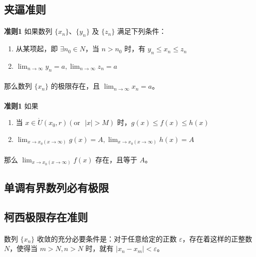 \subsection{夹逼准则}
\paragraph{}
\textbf{准则1} 如果数列 $\{x_n\}$、$\{y_n\}$ 及 $\{z_n\}$ 满足下列条件：

\begin{enumerate}
  \item 从某项起，即 $\exists n_0 \in N$，当 $n > n_0$ 时，有 $y_n \leq x_n \leq z_n$
  \item $\displaystyle{\lim_{n \to \infty} y_n = a, \lim_{n \to \infty} z_n = a}$
\end{enumerate}

\paragraph{}
那么数列 $\{x_n\}$ 的极限存在，且 $\displaystyle{\lim_{n \to \infty} x_n = a}$。

\paragraph{}
\textbf{准则1} 如果

\begin{enumerate}
  \item 当 $x \in \mathring{U}(x_0, r)(\text{or~~}|x| > M)$ 时，$g(x) \leq f(x) \leq h(x)$
  \item $\displaystyle{\lim_{x \to x_0 (x \to \infty)} g(x) = A, \lim_{x \to x_0 (x \to \infty)} h(x) = A}$
\end{enumerate}

\paragraph{}
那么 $\displaystyle{\lim_{x \to x_0 (x \to \infty)} f(x)}$ 存在，且等于 $A$。

\subsection{单调有界数列必有极限}

\subsection{柯西极限存在准则}
\paragraph{}
数列 $\{x_n\}$ 收敛的充分必要条件是：对于任意给定的正数 $\varepsilon$，存在着这样的正整数 $N$，使得当 $m > N, n > N$ 时，就有 $|x_n - x_m| < \varepsilon$。
